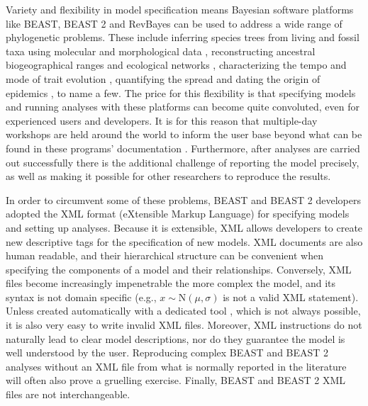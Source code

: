 \documentclass[10pt,letterpaper,table]{article}
\begin{document}
Variety and flexibility in model specification means Bayesian software
platforms like BEAST, BEAST 2 and RevBayes can be used to address a
wide range of phylogenetic problems. 
These include inferring species trees from living and fossil taxa
using molecular and morphological data
\cite{gavryushkina17,ogilvie21,zhang21}, reconstructing ancestral
biogeographical ranges \cite{lemey10,landis18} and ecological networks
\cite{braga20}, characterizing the tempo and mode of trait evolution
\cite{may19,bite}, quantifying the spread and dating the origin of
epidemics \cite{faria21,douglas21}, to name a few.
The price for this flexibility is that specifying models and running
analyses with these platforms can become quite convoluted,
even for experienced users and developers.
It is for this reason that multiple-day workshops are held around the
world to inform the user base beyond what can be found in these programs'
documentation \cite{taming,revworkshop}.
Furthermore, after analyses are carried out successfully there is the
additional challenge of reporting the model precisely, as well as
making it possible for other researchers to reproduce the results.

In order to circumvent some of these problems, BEAST \cite{beast} and
BEAST 2 \cite{beast2} developers adopted the XML format (eXtensible
Markup Language) for specifying models and setting up analyses.
Because it is extensible, XML allows developers to create new
descriptive tags for the specification of new models.
XML documents are also human readable, and their hierarchical
structure can be convenient when specifying the components of a model
and their relationships.
Conversely, XML files become increasingly impenetrable the more
complex the model, and its syntax is not domain specific (e.g., $x
\sim \text{N}(\mu, \sigma)$ is not a valid XML statement).
Unless created automatically with a dedicated tool \cite{beauti},
which is not always possible, it is also very easy to write 
invalid XML files.
Moreover, XML instructions do not naturally lead to clear model
descriptions, nor do they guarantee the model is well understood by
the user.
Reproducing complex BEAST and BEAST 2 analyses without an XML file
from what is normally reported in the literature will often also prove
a gruelling exercise.
Finally, BEAST and BEAST 2 XML files are not interchangeable. 

\end{document}
